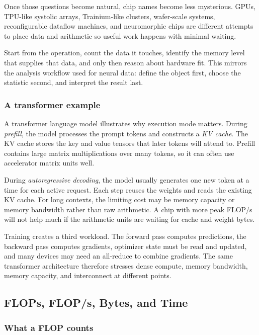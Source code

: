 Once those questions become natural, chip names become less mysterious. GPUs, TPU-like systolic arrays, Trainium-like clusters, wafer-scale systems, reconfigurable dataflow machines, and neuromorphic chips are different attempts to place data and arithmetic so useful work happens with minimal waiting.

\begin{aside}
Start from the operation, count the data it touches, identify the memory level that supplies that data, and only then reason about hardware fit. This mirrors the analysis workflow used for neural data: define the object first, choose the statistic second, and interpret the result last.
\end{aside}

\subsubsection{A transformer example}

A transformer language model illustrates why execution mode matters. During \emph{prefill}, the model processes the prompt tokens and constructs a \emph{KV cache}. The KV cache stores the key and value tensors that later tokens will attend to. Prefill contains large matrix multiplications over many tokens, so it can often use accelerator matrix units well.

During \emph{autoregressive decoding}, the model usually generates one new token at a time for each active request. Each step reuses the weights and reads the existing KV cache. For long contexts, the limiting cost may be memory capacity or memory bandwidth rather than raw arithmetic. A chip with more peak FLOP/s will not help much if the arithmetic units are waiting for cache and weight bytes.

Training creates a third workload. The forward pass computes predictions, the backward pass computes gradients, optimizer state must be read and updated, and many devices may need an all-reduce to combine gradients. The same transformer architecture therefore stresses dense compute, memory bandwidth, memory capacity, and interconnect at different points.

\subsection{FLOPs, FLOP/s, Bytes, and Time}

\subsubsection{What a FLOP counts}

